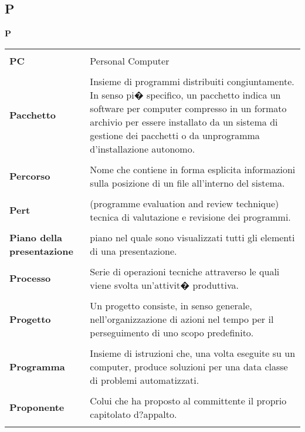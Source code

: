 {\subsection{P} 
\hfill\Huge{\textbf{P}} \\ 
\normalsize 
\begin{longtabu} to 
\toprule \\ 
\textbf{PC} & Personal Computer \\ 
 \\ 
\textbf{Pacchetto} & Insieme di programmi distribuiti congiuntamente. In senso pi� specifico, un pacchetto indica un software per computer compresso in un formato archivio per essere installato da un sistema di gestione dei pacchetti o da unprogramma d'installazione autonomo. \\ 
 \\ 
\textbf{Percorso} & Nome che contiene in forma esplicita informazioni sulla posizione di un file all'interno del sistema. \\ 
 \\ 
\textbf{Pert} & (programme evaluation and review technique) tecnica di valutazione e revisione dei programmi. \\ 
 \\ 
\textbf{Piano della presentazione} & piano nel quale sono visualizzati tutti gli elementi di una presentazione. \\ 
 \\ 
\textbf{Processo} & Serie di operazioni tecniche attraverso le quali viene svolta un'attivit� produttiva. \\ 
 \\ 
\textbf{Progetto} & Un progetto consiste, in senso generale, nell'organizzazione di azioni nel tempo per il perseguimento di uno scopo predefinito. \\ 
 \\ 
\textbf{Programma} & Insieme di istruzioni che, una volta eseguite su un computer, produce soluzioni per una data classe di problemi automatizzati. \\ 
 \\ 
\textbf{Proponente} & Colui che ha proposto al committente il proprio capitolato d?appalto. \\ 
 \\ 
\end{longtabu} 
\newpage 
}
